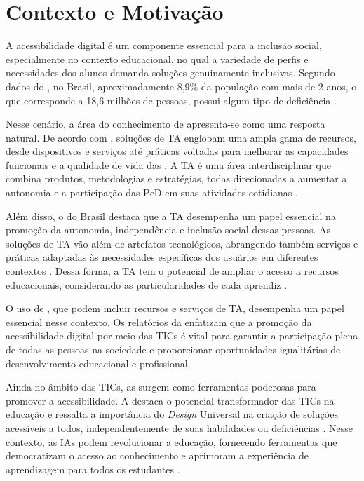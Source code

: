 \section{Contexto e Motivação}

A acessibilidade digital é um componente essencial para a inclusão social, especialmente no contexto educacional, no qual a variedade de perfis e necessidades dos alunos demanda soluções genuinamente inclusivas. Segundo dados do , no Brasil, aproximadamente 8,9\% da população com mais de 2 anos, o que corresponde a 18,6 milhões de pessoas, possui algum tipo de deficiência \cite{IBGE2023}.

Nesse cenário, a área do conhecimento de  apresenta-se como uma resposta natural. De acordo com , soluções de TA englobam uma ampla gama de recursos, desde dispositivos e serviços até práticas voltadas para melhorar as capacidades funcionais e a qualidade de vida das . A TA é uma área interdisciplinar que combina produtos, metodologias e estratégias, todas direcionadas a aumentar a autonomia e a participação das PcD em suas atividades cotidianas \cite{Cat2009}.

Além disso, o  do Brasil destaca que a TA desempenha um papel essencial na promoção da autonomia, independência e inclusão social dessas pessoas. As soluções de TA vão além de artefatos tecnológicos, abrangendo também serviços e práticas adaptadas às necessidades específicas dos usuários em diferentes contextos \cite{Cat2009}. Dessa forma, a TA tem o potencial de ampliar o acesso a recursos educacionais, considerando as particularidades de cada aprendiz \cite{UNESCO2023, GovBr2023}.

O uso de , que podem incluir recursos e serviços de TA, desempenha um papel essencial nesse contexto. Os relatórios da  enfatizam que a promoção da acessibilidade digital por meio das TICs é vital para garantir a participação plena de todas as pessoas na sociedade e proporcionar oportunidades igualitárias de desenvolvimento educacional e profissional.

Ainda no âmbito das TICs, as  surgem como ferramentas poderosas para promover a acessibilidade. A  destaca o potencial transformador das TICs na educação e ressalta a importância do \textit{Design} Universal na criação de soluções acessíveis a todos, independentemente de suas habilidades ou deficiências \cite{UNESCO2023, GovBr2023}. Nesse contexto, as IAs podem revolucionar a educação, fornecendo ferramentas que democratizam o acesso ao conhecimento e aprimoram a experiência de aprendizagem para todos os estudantes \cite{Holmes2019,UNESCO2024}.

